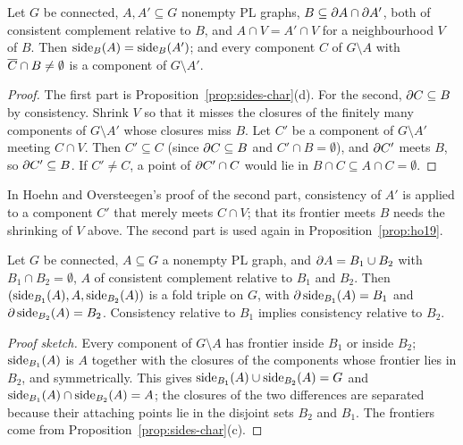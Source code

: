 
\begin{proposition}\label{prop:ho10}
Let $G$ be connected, $A,A'\subseteq G$ nonempty PL graphs, $B\subseteq\partial A\cap\partial A'$, both of consistent complement relative to $B$, and $A\cap V=A'\cap V$ for a
neighbourhood $V$ of $B$. Then $\operatorname{side}_B(A)=\operatorname{side}_B(A')$; and every component $C$ of $G\setminus A$ with $\overline{C}\cap B\neq\emptyset$ is a component of $G\setminus A'$.
\end{proposition}

\begin{proof}
The first part is Proposition~\ref{prop:sides-char}(d). For the second, $\partial C\subseteq B$ by consistency. Shrink $V$ so that it misses the closures of the finitely
many components of $G\setminus A'$ whose closures miss $B$. Let $C'$ be a component of $G\setminus A'$ meeting $C\cap V$. Then $C'\subseteq C$ (since $\partial C\subseteq B$ and $C'\cap
B=\emptyset$), and $\partial C'$ meets $B$, so $\partial C'\subseteq B$. If $C'\neq C$, a point of $\partial C'\cap C$ would lie in $B\cap C\subseteq A\cap C=\emptyset$.
\end{proof}


In Hoehn and Oversteegen's proof of the second part, consistency of $A'$ is applied to a component $C'$ that merely meets $C\cap V$; that its frontier meets
$B$ needs the shrinking of $V$ above. The second part is used again in Proposition~\ref{prop:ho19}.

\begin{proposition}\label{prop:ho11}
Let $G$ be connected, $A\subseteq G$ a nonempty PL graph, and $\partial A=B_1\cup B_2$ with $B_1\cap B_2=\emptyset$, $A$ of consistent complement relative to $B_1$ and $B_2$.
Then $(\operatorname{side}_{B_1}(A),A,\operatorname{side}_{B_2}(A))$ is a fold triple on $G$, with $\partial\operatorname{side}_{B_1}(A)=B_1$ and $\partial\operatorname{side}_{B_2}(A)=B_2$. Consistency relative to $B_1$ implies
consistency relative to $B_2$.
\end{proposition}

\begin{proof}[Proof sketch]
Every component of $G\setminus A$ has frontier inside $B_1$ or inside $B_2$; $\operatorname{side}_{B_1}(A)$ is $A$ together with the closures of the components whose frontier lies in
$B_2$, and symmetrically. This gives $\operatorname{side}_{B_1}(A)\cup\operatorname{side}_{B_2}(A)=G$ and $\operatorname{side}_{B_1}(A)\cap\operatorname{side}_{B_2}(A)=A$; the closures of the two differences are separated
because their attaching points lie in the disjoint sets $B_2$ and $B_1$. The frontiers come from Proposition~\ref{prop:sides-char}(c).
\end{proof}


